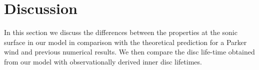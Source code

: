 \documentclass[usenatbib,useAMS,usedcolumn]{mnras}
\begin{document}






\section{Discussion}\label{sec:discussion}

In this section we discuss the differences between the properties at the sonic surface in our model in comparison with the theoretical prediction for a Parker wind and previous numerical results. We then compare the disc life-time obtained from our model with observationally derived inner disc lifetimes.
\end{document}
